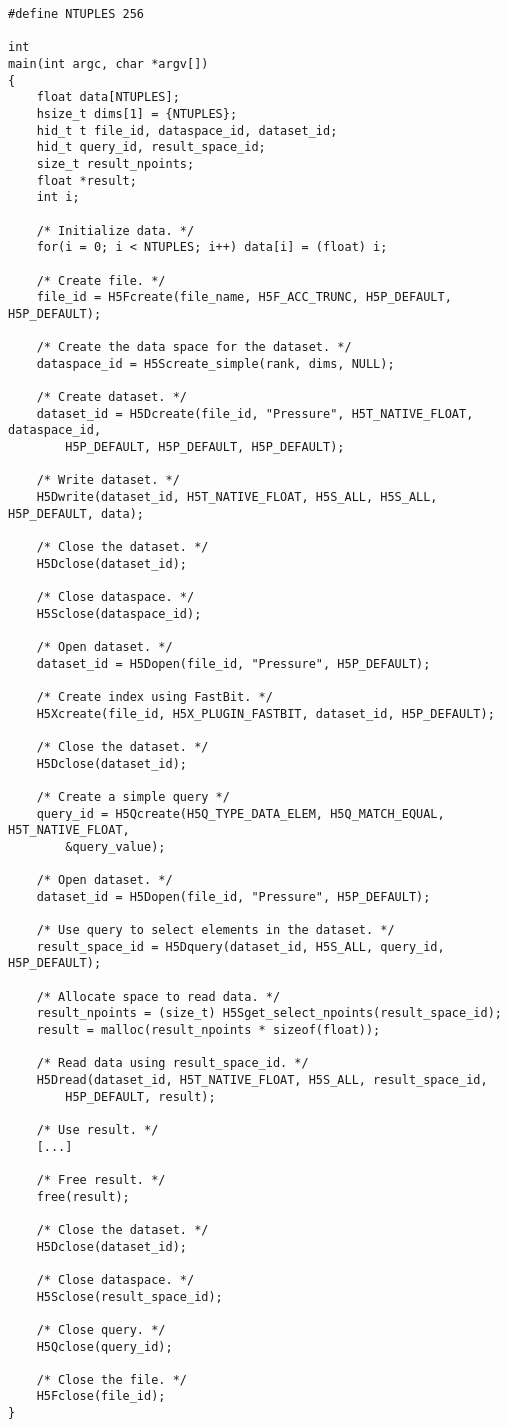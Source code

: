 {
\begin{lstlisting}
#define NTUPLES 256

int
main(int argc, char *argv[])
{
    float data[NTUPLES];
    hsize_t dims[1] = {NTUPLES};
    hid_t t file_id, dataspace_id, dataset_id;
    hid_t query_id, result_space_id;
    size_t result_npoints;
    float *result;
    int i;

    /* Initialize data. */
    for(i = 0; i < NTUPLES; i++) data[i] = (float) i;

    /* Create file. */
    file_id = H5Fcreate(file_name, H5F_ACC_TRUNC, H5P_DEFAULT, H5P_DEFAULT);

    /* Create the data space for the dataset. */
    dataspace_id = H5Screate_simple(rank, dims, NULL);

    /* Create dataset. */
    dataset_id = H5Dcreate(file_id, "Pressure", H5T_NATIVE_FLOAT, dataspace_id,
        H5P_DEFAULT, H5P_DEFAULT, H5P_DEFAULT);

    /* Write dataset. */
    H5Dwrite(dataset_id, H5T_NATIVE_FLOAT, H5S_ALL, H5S_ALL, H5P_DEFAULT, data);

    /* Close the dataset. */
    H5Dclose(dataset_id);

    /* Close dataspace. */
    H5Sclose(dataspace_id);

    /* Open dataset. */
    dataset_id = H5Dopen(file_id, "Pressure", H5P_DEFAULT);

    /* Create index using FastBit. */
    H5Xcreate(file_id, H5X_PLUGIN_FASTBIT, dataset_id, H5P_DEFAULT);

    /* Close the dataset. */
    H5Dclose(dataset_id);

    /* Create a simple query */
    query_id = H5Qcreate(H5Q_TYPE_DATA_ELEM, H5Q_MATCH_EQUAL, H5T_NATIVE_FLOAT,
        &query_value);

    /* Open dataset. */
    dataset_id = H5Dopen(file_id, "Pressure", H5P_DEFAULT);

    /* Use query to select elements in the dataset. */
    result_space_id = H5Dquery(dataset_id, H5S_ALL, query_id, H5P_DEFAULT);

    /* Allocate space to read data. */ 
    result_npoints = (size_t) H5Sget_select_npoints(result_space_id);
    result = malloc(result_npoints * sizeof(float));

    /* Read data using result_space_id. */
    H5Dread(dataset_id, H5T_NATIVE_FLOAT, H5S_ALL, result_space_id,
        H5P_DEFAULT, result);

    /* Use result. */
    [...]

    /* Free result. */
    free(result);

    /* Close the dataset. */
    H5Dclose(dataset_id);

    /* Close dataspace. */
    H5Sclose(result_space_id);

    /* Close query. */
    H5Qclose(query_id);

    /* Close the file. */
    H5Fclose(file_id);
}
\end{lstlisting}
}


